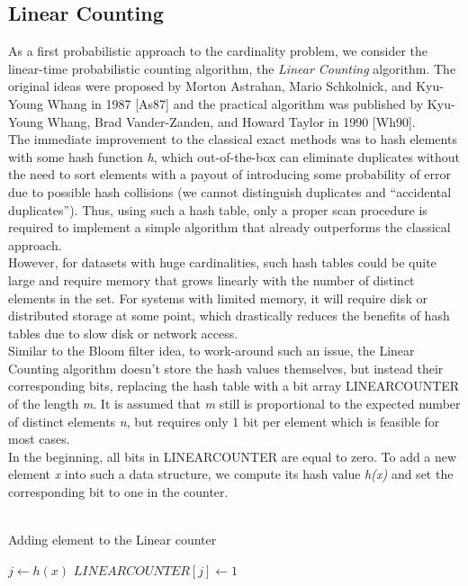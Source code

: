 \documentclass[a4paper,13pt]{article}
\theoremstyle{mytheor}
\begin{document}
\subsection{Linear Counting}
As a first probabilistic approach to the cardinality problem, we consider
the linear-time probabilistic counting algorithm, the \textit{Linear Counting}
algorithm. The original ideas were proposed by Morton Astrahan, Mario Schkolnick,
and Kyu-Young Whang in 1987 [As87] and the practical algorithm was published
by Kyu-Young Whang, Brad Vander-Zanden, and Howard Taylor in 1990 [Wh90].\\
\indent The immediate improvement to the classical exact methods was to
hash elements with some hash function \textit{h}, which out-of-the-box can
eliminate duplicates without the need to sort elements with a payout of
introducing some probability of error due to possible hash collisions
(we cannot distinguish duplicates and \textquotedblleft accidental duplicates\textquotedblright).
Thus, using such a hash table, only a proper scan procedure is required to implement
a simple algorithm that already outperforms the classical approach.\\
\indent However, for datasets with huge cardinalities, such hash tables could
be quite large and require memory that grows linearly with the number
of distinct elements in the set. For systems with limited memory, it
will require disk or distributed storage at some point, which drastically
reduces the benefits of hash tables due to slow disk or network access.\\
\indent Similar to the Bloom filter idea, to work-around such an issue,
the Linear Counting algorithm doesn't store the hash values themselves,
but instead their corresponding bits, replacing the hash table with a bit
array LINEARCOUNTER of the length \textit{m}. It is assumed that \textit{m} still is
proportional to the expected number of distinct elements \textit{n}, but requires
only 1 bit per element which is feasible for most cases.\\
\indent In the beginning, all bits in LINEARCOUNTER are equal to zero. To
add a new element \textit{x} into such a data structure, we compute its hash
value \textit{h(x)} and set the corresponding bit to one in the counter.\\\\
\vspace{0.5cm}
\begin{algorithm}[H]
    \DontPrintSemicolon
    \LinesNumberedHidden
    \caption[]{Adding element to the Linear counter}
    $j \gets h(x)$\;
    {
        $LINEARCOUNTER[j]\gets 1$
    }
\end{algorithm}
\end{document}
